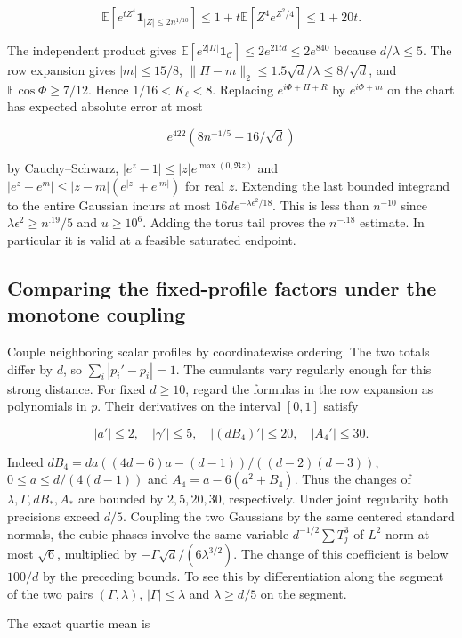 \documentclass[11pt]{article}
\begin{document}
\[
\mathbb E[e^{t Z^4}\mathbf1_{|Z|\le2n^{1/10}}]\le 1+t\mathbb E[Z^4 e^{Z^2/4}]\le1+20t .
\]

The independent product gives $\mathbb E[e^{2|\Pi|}\mathbf1_{\mathcal C}]\le2e^{21td}\le2e^{840}$ because $d/\lambda\le5$. The row expansion gives $|m|\le15/8$, $\|\Pi-m\|_2\le1.5\sqrt d/\lambda\le8/\sqrt d$, and $\mathbb E\cos\Phi\ge7/12$. Hence $1/16<K_{\ell}<8$. Replacing $e^{i\Phi+\Pi+R}$ by $e^{i\Phi+m}$ on the chart has expected absolute error at most

\[
e^{422}\left(8n^{-1/5}+16/\sqrt d\right)
\]

by Cauchy--Schwarz, $|e^z-1|\le |z|e^{\max(0,\Re z)}$ and $|e^z-e^m|\le |z-m|(e^{|z|}+e^{|m|})$ for real $z$. Extending the last bounded integrand to the entire Gaussian incurs at most $16d e^{-\lambda\epsilon^2/18}$. This is less than $n^{-10}$ since $\lambda\epsilon^2\ge n^{.19}/5$ and $u\ge10^6$. Adding the torus tail proves the $n^{-.18}$ estimate. In particular it is valid at a feasible saturated endpoint.

\subsection{Comparing the fixed-profile factors under the monotone coupling}

Couple neighboring scalar profiles by coordinatewise ordering. The two totals differ by $d$, so $\sum_i|p_i'-p_i|=1$. The cumulants vary regularly enough for this strong distance. For fixed $d\ge10$, regard the formulas in the row expansion as polynomials in $p$. Their derivatives on the interval $[0,1]$ satisfy

\[
|a'|\le2,\quad |\gamma'|\le5,\quad |(dB_4)'|\le20,\quad |A_4'|\le30 .
\]

Indeed $dB_4= da((4d-6)a-(d-1))/((d-2)(d-3))$, $0\le a\le d/(4(d-1))$ and $A_4=a-6(a^2+B_4)$. Thus the changes of $\lambda,\Gamma,dB_{\ast},A_{\ast}$ are bounded by $2,5,20,30$, respectively. Under joint regularity both precisions exceed $d/5$. Coupling the two Gaussians by the same centered standard normals, the cubic phases involve the same variable $d^{-1/2}\sum T_j^3$ of $L^2$ norm at most $\sqrt6$, multiplied by $-\Gamma\sqrt d/(6\lambda^{3/2})$. The change of this coefficient is below $100/d$ by the preceding bounds. To see this by differentiation along the segment of the two pairs $(\Gamma,\lambda)$, $|\Gamma|\le\lambda$ and $\lambda\ge d/5$ on the segment.

The exact quartic mean is
\end{document}
